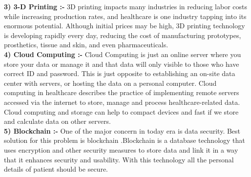 \documentclass[12pt]{article}
\begin{document}
\textbf{3) 3-D Printing :-} 3D printing impacts many industries in reducing labor costs while increasing production rates, and healthcare is one industry tapping into its enormous potential. Although initial prices may be high, 3D printing technology is developing rapidly every day, reducing the cost of manufacturing prototypes, prosthetics, tissue and skin, and even pharmaceuticals.\\

\textbf{4) Cloud Computing :- }Cloud Computing is just an online server where you store your data or manage it and that data will only visible to those who have correct ID and password. This is just opposite  to establishing an on-site data center with servers, or hosting the data on a personal computer. Cloud computing in healthcare describes the practice of implementing remote servers accessed via the internet to store, manage and process healthcare-related data. Cloud computing and storage can help to compact devices and fast if we store and calculate data on other servers.\\

\textbf{5) Blockchain :-} One of the major concern in today era is data security. Best solution for this problem is blockchain .Blockchain is a database technology that uses encryption and other security measures to store data and link it in a way that it  enhances security and usability. With this technology all the personal details of patient should be secure.
\end{document}
